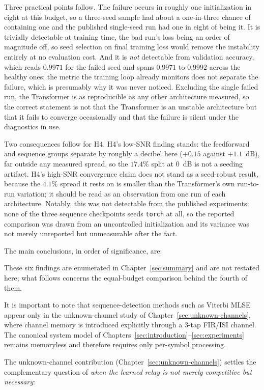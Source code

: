 Three practical points follow. The failure occurs in roughly one initialization in eight at this budget, so a three-seed sample had about a one-in-three chance of containing one and the published single-seed run had one in eight of being it. It is trivially detectable at training time, the bad run's loss being an order of magnitude off, so seed selection on final training loss would remove the instability entirely at no evaluation cost. And it is \emph{not} detectable from validation accuracy, which reads $0.9971$ for the failed seed and spans $0.9971$ to $0.9992$ across the healthy ones: the metric the training loop already monitors does not separate the failure, which is presumably why it was never noticed. Excluding the single failed run, the Transformer is as reproducible as any other architecture measured, so the correct statement is not that the Transformer is an unstable architecture but that it fails to converge occasionally and that the failure is silent under the diagnostics in use.

Two consequences follow for H4. H4's low-SNR finding stands: the feedforward and sequence groups separate by roughly a decibel here ($+0.15$ against $+1.1$~dB), far outside any measured spread, so the $17.4\%$ split at 0~dB is not a seeding artifact. H4's high-SNR convergence claim does not stand as a seed-robust result, because the $4.1\%$ spread it rests on is smaller than the Transformer's own run-to-run variation; it should be read as an observation from one run of each architecture. Notably, this was not detectable from the published experiments: none of the three sequence checkpoints seeds \texttt{torch} at all, so the reported comparison was drawn from an uncontrolled initialization and its variance was not merely unreported but unmeasurable after the fact.

The main conclusions, in order of significance, are:

These six findings are enumerated in Chapter~\ref{sec:summary} and are not restated here; what follows concerns the equal-budget comparison behind the fourth of them.

It is important to note that sequence-detection methods such as Viterbi MLSE appear only in the unknown-channel study of Chapter~\ref{sec:unknown-channels}, where channel memory is introduced explicitly through a 3-tap FIR/ISI channel. The canonical system model of Chapters~\ref{sec:introduction}--\ref{sec:experiments} remains memoryless and therefore requires only per-symbol processing.

The unknown-channel contribution (Chapter~\ref{sec:unknown-channels}) settles the complementary question of \emph{when the learned relay is not merely competitive but necessary}:

